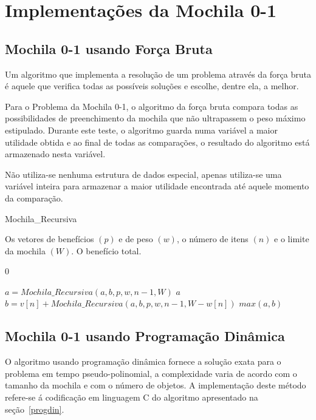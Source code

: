 \section{Implementações da Mochila 0-1}

\subsection{Mochila 0-1 usando Força Bruta} \label{imp:force}
Um algoritmo que implementa a resolução de um problema através da força bruta é aquele que verifica todas as possíveis soluções e escolhe, dentre ela, a melhor. 

Para o Problema da Mochila 0-1, o algoritmo da força bruta compara todas as possibilidades de preenchimento da mochila que não ultrapassem o peso máximo estipulado. Durante este teste, o algoritmo guarda numa variável a maior utilidade obtida e ao final de todas as comparações, o resultado do algoritmo está armazenado nesta variável.

Não utiliza-se nenhuma estrutura de dados especial, apenas utiliza-se uma variável inteira para armazenar a maior utilidade encontrada até aquele momento da comparação.

\begin{algorithm}
\caption{Mochila\_Recursiva} %
\label{alg1}
\scriptsize
\begin{algorithmic}[1]

  \REQUIRE Os vetores de benefícios $(p)$ e de peso $(w)$, o número de itens $(n)$ e o limite da mochila $(W)$.
	\ENSURE O benefício total.

    \RETURN $0$
	\ENDIF

  \STATE $a = Mochila\_Recursiva(a, b, p, w, n-1, W)$
    \RETURN $a$
  \ELSE
    \STATE $b = v[n] + Mochila\_Recursiva(a, b, p, w, n-1, W-w[n])$
    \RETURN $max(a, b)$
  \ENDIF

\end{algorithmic}
\end{algorithm}

\subsection{Mochila 0-1 usando Programação Dinâmica}
O algoritmo usando programação dinâmica fornece a solução exata para o problema em tempo pseudo-polinomial, a complexidade varia de acordo com o tamanho da mochila e com o número de objetos. A implementação deste método refere-se á codificação em linguagem C do algoritmo apresentado na seção~\ref{progdin}.


